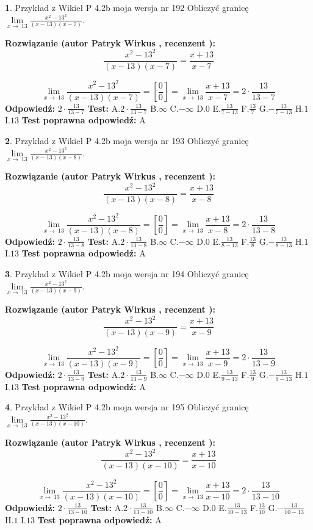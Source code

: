 \documentclass[12pt, a4paper]{article}
\theoremstyle{definition} %
\newtheorem{zad}{}
\newcommand{\zadStart}[1]{\begin{zad}#1\newline}
\newcommand{\zadStop}{\end{zad}}
\newcommand{\rozwStart}[2]{\noindent \textbf{Rozwiązanie (autor #1 , recenzent #2): }\newline}
\newcommand{\rozwStop}{\newline}
\newcommand{\odpStart}{\noindent \textbf{Odpowiedź:}\newline}
\newcommand{\odpStop}{\newline}
\newcommand{\testStart}{\noindent \textbf{Test:}\newline}
\newcommand{\testStop}{\newline}
\newcommand{\kluczStart}{\noindent \textbf{Test poprawna odpowiedź:}\newline}
\newcommand{\kluczStop}{\newline}
\begin{document}
\zadStart{Przykład z Wikieł P 4.2b moja wersja nr 192}
Obliczyć granicę $\lim\limits_{x\to\ 13}\frac{x^{2}-13^{2}}{(x-13)(x-7)}$.
\zadStop
\rozwStart{Patryk Wirkus}{}
$$\frac{x^{2}-13^{2}}{(x-13)(x-7)}=\frac{x+13}{x-7}$$

$$\lim\limits_{x\to\ 13}\frac{x^{2}-13^{2}}{(x-13)(x-7)}=[\frac{0}{0}]=\lim\limits_{x\to\ 13}\frac{x+13}{x-7}=2 \cdot \frac{13}{13-7}$$
\rozwStop
\odpStart
$2 \cdot \frac{13}{13-7}$
\odpStop
\testStart
A.$2 \cdot \frac{13}{13-7}$
B.$\infty$
C.$-\infty$
D.$0$
E.$\frac{13}{7-13}$
F.$\frac{13}{7}$
G.$-\frac{13}{7-13}$
H.$1$
I.$13$
\testStop
\kluczStart
A
\kluczStop



\zadStart{Przykład z Wikieł P 4.2b moja wersja nr 193}
Obliczyć granicę $\lim\limits_{x\to\ 13}\frac{x^{2}-13^{2}}{(x-13)(x-8)}$.
\zadStop
\rozwStart{Patryk Wirkus}{}
$$\frac{x^{2}-13^{2}}{(x-13)(x-8)}=\frac{x+13}{x-8}$$

$$\lim\limits_{x\to\ 13}\frac{x^{2}-13^{2}}{(x-13)(x-8)}=[\frac{0}{0}]=\lim\limits_{x\to\ 13}\frac{x+13}{x-8}=2 \cdot \frac{13}{13-8}$$
\rozwStop
\odpStart
$2 \cdot \frac{13}{13-8}$
\odpStop
\testStart
A.$2 \cdot \frac{13}{13-8}$
B.$\infty$
C.$-\infty$
D.$0$
E.$\frac{13}{8-13}$
F.$\frac{13}{8}$
G.$-\frac{13}{8-13}$
H.$1$
I.$13$
\testStop
\kluczStart
A
\kluczStop



\zadStart{Przykład z Wikieł P 4.2b moja wersja nr 194}
Obliczyć granicę $\lim\limits_{x\to\ 13}\frac{x^{2}-13^{2}}{(x-13)(x-9)}$.
\zadStop
\rozwStart{Patryk Wirkus}{}
$$\frac{x^{2}-13^{2}}{(x-13)(x-9)}=\frac{x+13}{x-9}$$

$$\lim\limits_{x\to\ 13}\frac{x^{2}-13^{2}}{(x-13)(x-9)}=[\frac{0}{0}]=\lim\limits_{x\to\ 13}\frac{x+13}{x-9}=2 \cdot \frac{13}{13-9}$$
\rozwStop
\odpStart
$2 \cdot \frac{13}{13-9}$
\odpStop
\testStart
A.$2 \cdot \frac{13}{13-9}$
B.$\infty$
C.$-\infty$
D.$0$
E.$\frac{13}{9-13}$
F.$\frac{13}{9}$
G.$-\frac{13}{9-13}$
H.$1$
I.$13$
\testStop
\kluczStart
A
\kluczStop



\zadStart{Przykład z Wikieł P 4.2b moja wersja nr 195}
Obliczyć granicę $\lim\limits_{x\to\ 13}\frac{x^{2}-13^{2}}{(x-13)(x-10)}$.
\zadStop
\rozwStart{Patryk Wirkus}{}
$$\frac{x^{2}-13^{2}}{(x-13)(x-10)}=\frac{x+13}{x-10}$$

$$\lim\limits_{x\to\ 13}\frac{x^{2}-13^{2}}{(x-13)(x-10)}=[\frac{0}{0}]=\lim\limits_{x\to\ 13}\frac{x+13}{x-10}=2 \cdot \frac{13}{13-10}$$
\rozwStop
\odpStart
$2 \cdot \frac{13}{13-10}$
\odpStop
\testStart
A.$2 \cdot \frac{13}{13-10}$
B.$\infty$
C.$-\infty$
D.$0$
E.$\frac{13}{10-13}$
F.$\frac{13}{10}$
G.$-\frac{13}{10-13}$
H.$1$
I.$13$
\testStop
\kluczStart
A
\kluczStop
\end{document}
